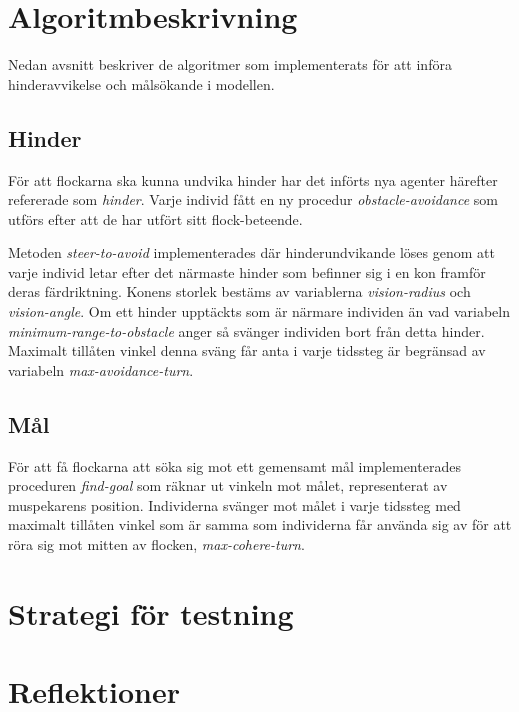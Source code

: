 \documentclass[titlepage, a4paper, 12pt]{article}
\begin{document}
\section{Algoritmbeskrivning}
Nedan avsnitt beskriver de algoritmer som implementerats för att
införa hinderavvikelse och målsökande i modellen.

\subsection{Hinder}
För att flockarna ska kunna undvika hinder har det införts nya agenter
härefter refererade som \textit{hinder}. Varje individ fått en ny
procedur \textit{obstacle-avoidance} som utförs efter att de har
utfört sitt flock-beteende.

Metoden \textit{steer-to-avoid} implementerades där hinderundvikande
löses genom att varje individ letar efter det närmaste hinder som
befinner sig i en kon framför deras färdriktning. Konens storlek
bestäms av variablerna \textit{vision-radius} och
\textit{vision-angle}. Om ett hinder upptäckts som är närmare
individen än vad variabeln \textit{minimum-range-to-obstacle} anger så
svänger individen bort från detta hinder. Maximalt tillåten vinkel
denna sväng får anta i varje tidssteg är begränsad av variabeln
\textit{max-avoidance-turn}. %

\subsection{Mål}
För att få flockarna att söka sig mot ett gemensamt mål
implementerades proceduren \textit{find-goal} som räknar ut vinkeln
mot målet, representerat av muspekarens position. Individerna svänger
mot målet i varje tidssteg med maximalt tillåten vinkel som är samma
som individerna får använda sig av för att röra sig mot mitten av
flocken, \textit{max-cohere-turn}.

\section{Strategi för testning}

\section{Reflektioner}
\end{document}
